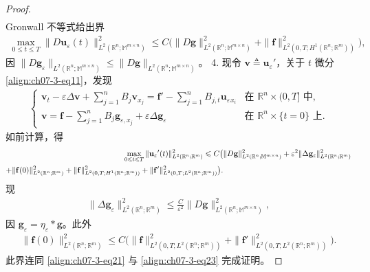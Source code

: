 \documentclass[../../main.tex]{subfiles}
\begin{document}
\begin{theorem}[能量估计]
\begin{proof}
\begin{align*}
\end{align*}
Gronwall 不等式给出界
\begin{align}
\max_{0\leqslant t\leqslant T}\|D\mathbf{u}_\varepsilon(t)\|_{L^2(\mathbb{R}^n;\mathbb{M}^{m\times n})}^2\leqslant C\bigl(\|D\mathbf{g}\|_{L^2(\mathbb{R}^n;\mathbb{M}^{m\times n})}^2+\|\mathbf{f}\|_{L^2(0,T;H^1(\mathbb{R}^n;\mathbb{R}^m))}^2\bigr),\label{align:ch07-3-eq23}
\end{align}
因 $\|D\mathbf{g}_\varepsilon\|_{L^2(\mathbb{R}^n;\mathbb{M}^{m\times n})}\leqslant\|D\mathbf{g}\|_{L^2(\mathbb{R}^n;\mathbb{M}^{m\times n})}$。
4. 现令 $\mathbf{v}\triangleq\mathbf{u}_\varepsilon{}'$，关于 $t$ 微分 \eqref{align:ch07-3-eq11}，发现
\begin{align}
\begin{cases}
\mathbf{v}_t-\varepsilon\Delta\mathbf{v}+\sum_{j=1}^nB_j\mathbf{v}_{x_j}=\mathbf{f}'-\sum_{j=1}^nB_{j,t}\mathbf{u}_\varepsilon{}_{x_i}&\text{在 }\mathbb{R}^n\times(0,T]\text{ 中},\\
\mathbf{v}=\mathbf{f}-\sum_{j=1}^nB_j\mathbf{g}_{\varepsilon,x_j}+\varepsilon\Delta\mathbf{g}_\varepsilon&\text{在 }\mathbb{R}^n\times\{t=0\}\text{ 上}.
\end{cases}\label{align:ch07-3-eq24}
\end{align}
如前计算，得
\begin{align}
\max_{0\leqslant t\leqslant T}\|\mathbf{u}_\varepsilon{}'(t)\|_{L^2(\mathbb{R}^n;\mathbb{R}^m)}^2\leqslant C\bigl(&\|D\mathbf{g}\|_{L^2(\mathbb{R}^n;\mathbb{M}^{m\times n})}^2+\varepsilon^2\|\Delta\mathbf{g}_\varepsilon\|_{L^2(\mathbb{R}^n;\mathbb{R}^m)}^2\notag\\
+\|\mathbf{f}(0)\|_{L^2(\mathbb{R}^n;\mathbb{R}^m)}^2+\|\mathbf{f}\|_{L^2(0,T;H^1(\mathbb{R}^n;\mathbb{R}^m))}^2+\|\mathbf{f}'\|_{L^2(0,T;L^2(\mathbb{R}^n;\mathbb{R}^m))}^2\bigr).\label{align:ch07-3-eq25}
\end{align}
现
\begin{align}
\|\Delta\mathbf{g}_\varepsilon\|_{L^2(\mathbb{R}^n;\mathbb{R}^m)}^2\leqslant\frac{C}{\varepsilon^2}\|D\mathbf{g}\|_{L^2(\mathbb{R}^n;\mathbb{M}^{m\times n})}^2,\label{align:ch07-3-eq26}
\end{align}
因 $\mathbf{g}_\varepsilon=\eta_\varepsilon*\mathbf{g}$。此外
\begin{align}
\|\mathbf{f}(0)\|_{L^2(\mathbb{R}^n;\mathbb{R}^m)}^2\leqslant C\bigl(\|\mathbf{f}\|_{L^2(0,T;L^2(\mathbb{R}^n;\mathbb{R}^m))}^2+\|\mathbf{f}'\|_{L^2(0,T;L^2(\mathbb{R}^n;\mathbb{R}^m))}^2\bigr).\label{align:ch07-3-eq27}
\end{align}
此界连同 \eqref{align:ch07-3-eq21} 与 \eqref{align:ch07-3-eq23} 完成证明。
\end{proof}
\end{theorem}
\end{document}
